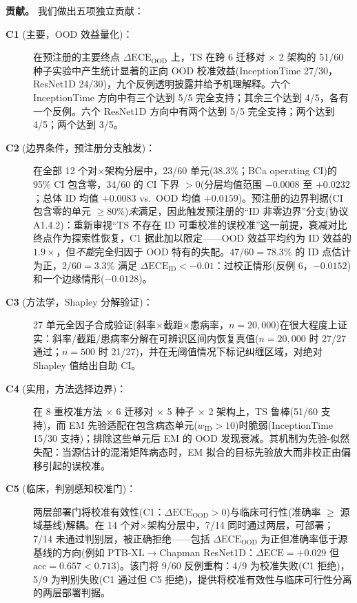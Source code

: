\textbf{贡献。} 我们做出五项独立贡献：
\begin{description}
    \item[\textbf{C1} (主要，OOD 效益量化)：] 在预注册的主要终点 $\Delta\text{ECE}_{\text{OOD}}$ 上，TS 在跨 6 迁移对 $\times$ 2 架构的 51/60 种子实验中产生统计显著的正向 OOD 校准效益(InceptionTime 27/30，ResNet1D 24/30)，九个反例透明披露并给予机理解释。六个 InceptionTime 方向中有三个达到 5/5 完全支持；其余三个达到 4/5，各有一个反例。六个 ResNet1D 方向中有两个达到 5/5 完全支持；两个达到 4/5；两个达到 3/5。
    \item[\textbf{C2} (边界条件，预注册分支触发)：] 在全部 12 个对$\times$架构分层中，23/60 单元(38.3\%；BCa operating CI)的 95\% CI 包含零，34/60 的 CI 下界 $>0$(分层均值范围 $-0.0008$ 至 $+0.0232$；总体 ID 均值 $+0.0083$ vs.\ OOD 均值 $+0.0159$)。预注册的边界判据(CI 包含零的单元 $\geq$80\%)\emph{未}满足，因此触发预注册的``ID 非零边界''分支(协议 A1.4.2)：重新审视``TS 不存在 ID 可重校准的误校准''这一前提，衰减对比终点作为探索性恢复，C1 据此加以限定——OOD 效益平均约为 ID 效益的 $1.9\times$，但\emph{不能}完全归因于 OOD 特有的失配。$47/60 = 78.3\%$ 的 ID 点估计为正，$2/60 = 3.3\%$ 满足 $\Delta\text{ECE}_{\text{ID}} < -0.01$：过校正情形(反例 6，$-0.0152$)和一个边缘情形($-0.0128$)。
    \item[\textbf{C3} (方法学，Shapley 分解验证)：] 27 单元全因子合成验证(斜率$\times$截距$\times$患病率，$n=20{,}000$)在很大程度上证实：斜率/截距/患病率分解在可辨识区间内恢复真值($n=20{,}000$ 时 27/27 通过；$n=500$ 时 21/27)，并在无阈值情况下标记纠缠区域，对绝对 Shapley 值给出自助 CI。
    \item[\textbf{C4} (实用，方法选择边界)：] 在 8 重校准方法 $\times$ 6 迁移对 $\times$ 5 种子 $\times$ 2 架构上，TS 鲁棒(51/60 支持)，而 EM 先验适配在包含病态单元($w_{\text{ID}}>10$)时脆弱(InceptionTime 15/30 支持)；排除这些单元后 EM 的 OOD 发现衰减。其机制为先验-似然失配：当源估计的混淆矩阵病态时，EM 拟合的目标先验放大而非校正由偏移引起的误校准。
    \item[\textbf{C5} (临床，判别感知校准门)：] 两层部署门将校准有效性(C1：$\Delta\text{ECE}_{\text{OOD}}>0$)与临床可行性(准确率 $\geq$ 源域基线)解耦。在 14 个对$\times$架构分层中，7/14 同时通过两层，可部署；7/14 未通过判别层，被正确拒绝——包括 $\Delta\text{ECE}_{\text{OOD}}$ 为正但准确率低于源基线的方向(例如 PTB-XL$\rightarrow$Chapman ResNet1D：$\Delta\text{ECE}=+0.029$ 但 $\text{acc}=0.657 < 0.713$)。该门将 9/60 反例重构：4/9 为校准失败(C1 拒绝)，5/9 为判别失败(C1 通过但 C5 拒绝)，提供将校准有效性与临床可行性分离的两层部署判据。
\end{description}

